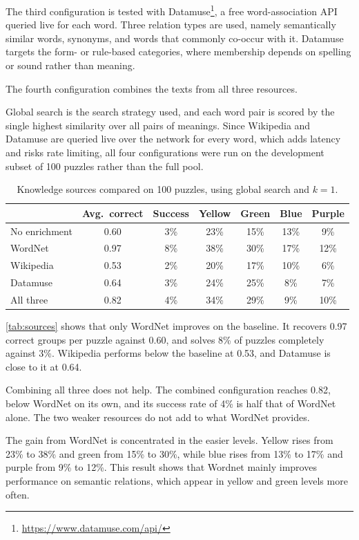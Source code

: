 The third configuration is tested with Datamuse\footnote{\url{https://www.datamuse.com/api/}}, a free word-association API queried live for each word. Three relation types are used, namely semantically similar words, synonyms, and words that commonly co-occur with it. Datamuse targets the form- or rule-based categories, where membership depends on spelling or sound rather than meaning.

The fourth configuration combines the texts from all three resources.

Global search is the search strategy used, and each word pair is scored by the single highest similarity over all pairs of meanings. Since Wikipedia and Datamuse are queried live over the network for every word, which adds latency and risks rate limiting, all four configurations were run on the development subset of 100 puzzles rather than the full pool.

\begin{table}[t]
\centering
\caption{Knowledge sources compared on 100 puzzles, using global search and $k = 1$.}
\label{tab:sources}
\begin{tabular}{lcccccc}
\toprule
& Avg.\ correct & Success & Yellow & Green & Blue & Purple \\
\midrule
No enrichment & 0.60 & 3\% & 23\% & 15\% & 13\% & 9\% \\
WordNet & 0.97 & 8\% & 38\% & 30\% & 17\% & 12\% \\
Wikipedia & 0.53 & 2\% & 20\% & 17\% & 10\% & 6\% \\
Datamuse & 0.64 & 3\% & 24\% & 25\% & 8\% & 7\% \\
All three & 0.82 & 4\% & 34\% & 29\% & 9\% & 10\% \\
\bottomrule
\end{tabular}
\end{table}

\autoref{tab:sources} shows that only WordNet improves on the baseline. It recovers 0.97 correct groups per puzzle against 0.60, and solves 8\% of puzzles completely against 3\%. Wikipedia performs below the baseline at 0.53, and Datamuse is close to it at 0.64.

Combining all three does not help. The combined configuration reaches 0.82, below WordNet on its own, and its success rate of 4\% is half that of WordNet alone. The two weaker resources do not add to what WordNet provides.

The gain from WordNet is concentrated in the easier levels. Yellow rises from 23\% to 38\% and green from 15\% to 30\%, while blue rises from 13\% to 17\% and purple from 9\% to 12\%. This result shows that Wordnet mainly improves performance on semantic relations, which appear in yellow and green levels more often.

